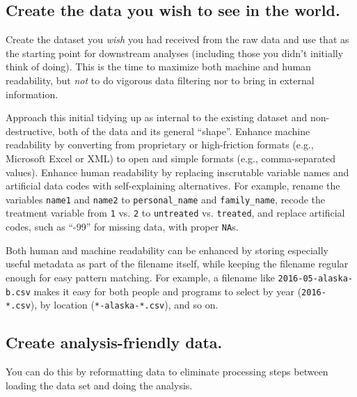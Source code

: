 \documentclass[10pt]{article}
\begin{document}
\subsection*{Create the data you wish to see in the world.}

Create the dataset you \emph{wish} you had received from the raw data
and use that as the starting point for downstream analyses (including
those you didn't initially think of doing). This is the time to maximize
both machine and human readability, but \emph{not} to do vigorous data
filtering nor to bring in external information.

Approach this initial tidying up as internal to the existing dataset and
non-destructive, both of the data and its general ``shape''. Enhance
machine readability by converting from proprietary or high-friction
formats (e.g., Microsoft Excel or XML) to open and simple formats (e.g.,
comma-separated values). Enhance human readability by replacing
inscrutable variable names and artificial data codes with
self-explaining alternatives. For example, rename the variables
\texttt{name1} and \texttt{name2} to \texttt{personal\_name} and
\texttt{family\_name}, recode the treatment variable from \texttt{1} vs.
\texttt{2} to \texttt{untreated} vs. \texttt{treated}, and replace
artificial codes, such as ``-99'' for missing data, with proper
\texttt{NA}s.

Both human and machine readability can be enhanced by storing especially
useful metadata as part of the filename itself, while keeping the
filename regular enough for easy pattern matching. For example, a
filename like \texttt{2016-05-alaska-b.csv} makes it easy for both
people and programs to select by year (\texttt{2016-*.csv}), by location
(\texttt{*-alaska-*.csv}), and so on.

\subsection*{Create analysis-friendly data.}

You can do this by reformatting data to eliminate processing steps
between loading the data set and doing the analysis.
\end{document}

